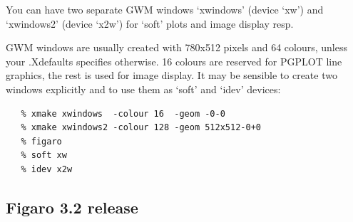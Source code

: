   You can have two separate GWM windows `xwindows' (device `xw') and
   `xwindows2' (device `x2w') for `soft' plots and image display resp.

   GWM windows are usually created with 780x512 pixels and 64 colours,
   unless your .Xdefaults specifies otherwise. 16 colours are reserved
   for PGPLOT line graphics, the rest is used for image display. It may
   be sensible to create two windows explicitly and to use them as
   `soft' and `idev' devices:

\begin{verbatim}
   % xmake xwindows  -colour 16  -geom -0-0
   % xmake xwindows2 -colour 128 -geom 512x512-0+0
   % figaro
   % soft xw
   % idev x2w
\end{verbatim}


\subsection{\label{news32}Figaro 3.2 release}


